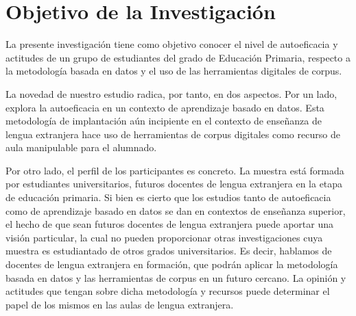 \section{Objetivo de la Investigación}\label{sec-objetivodelainvestigación}

La presente investigación tiene como objetivo conocer el nivel de
autoeficacia y actitudes de un grupo de estudiantes del grado de
Educación Primaria, respecto a la metodología basada en datos y el uso
de las herramientas digitales de corpus.

La novedad de nuestro estudio radica, por tanto, en dos aspectos. Por un
lado, explora la autoeficacia en un contexto de aprendizaje basado en
datos. Esta metodología de implantación aún incipiente en el contexto de
enseñanza de lengua extranjera hace uso de herramientas de corpus
digitales como recurso de aula manipulable para el alumnado.

Por otro lado, el perfil de los participantes es concreto. La muestra
está formada por estudiantes universitarios, futuros docentes de lengua
extranjera en la etapa de educación primaria. Si bien es cierto que los
estudios tanto de autoeficacia como de aprendizaje basado en datos se
dan en contextos de enseñanza superior, el hecho de que sean futuros
docentes de lengua extranjera puede aportar una visión particular, la
cual no pueden proporcionar otras investigaciones cuya muestra es
estudiantado de otros grados universitarios. Es decir, hablamos de
docentes de lengua extranjera en formación, que podrán aplicar la
metodología basada en datos y las herramientas de corpus en un futuro
cercano. La opinión y actitudes que tengan sobre dicha metodología y
recursos puede determinar el papel de los mismos en las aulas de lengua
extranjera.